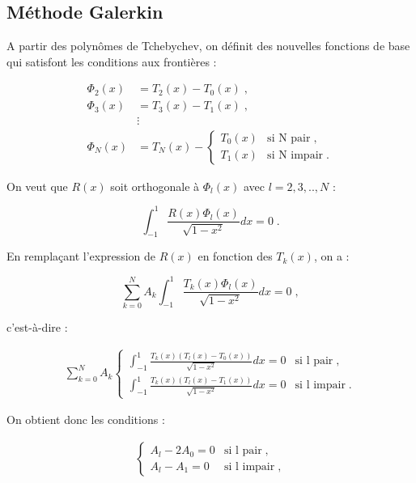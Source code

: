 \documentclass{report}
\begin{document}
\subsection{Méthode Galerkin}

A partir des polynômes de Tchebychev, on définit des nouvelles fonctions de base qui satisfont les conditions aux frontières :

\begin{align}
\Phi_{2}(x) &= T_2(x)-T_0(x)\;,\\
\Phi_{3}(x) &= T_3(x)-T_1(x)\;,\\
 & \vdots\\
\Phi_{N}(x) &= T_N(x)- \begin{cases}
    T_0(x) & \text{si N pair}\;, \\
T_1(x) & \text{si N impair}\;.
  \end{cases}
\end{align}

On veut que $R(x)$ soit orthogonale à $\Phi_l(x)$ avec $l=2,3,..,N$ :

\begin{equation}
\int_{-1}^1 \frac{R(x) \Phi_l(x)}{\sqrt{1-x^2}} dx = 0\;.
\end{equation}

En remplaçant l'expression de $R(x)$ en fonction des $T_k(x)$, on a :

\begin{equation}
\sum_{k=0}^{N}A_{k} \int_{-1}^1 \frac{T_k(x) \Phi_l(x)}{\sqrt{1-x^2}} dx = 0\;,
\end{equation}

c'est-à-dire :

\begin{align}
\sum_{k=0}^{N}A_{k} \begin{cases}
    \int_{-1}^1 \frac{T_k(x) \left(T_l(x)-T_0(x)\right)}{\sqrt{1-x^2}} dx = 0 & \text{si l pair}\;, \\
\int_{-1}^1 \frac{T_k(x) \left(T_l(x)-T_1(x)\right)}{\sqrt{1-x^2}} dx = 0 & \text{si l impair}\;.
  \end{cases}
\end{align}

On obtient donc les conditions :

\begin{align}
\begin{cases}
A_{l} - 2A_{0} = 0 & \text{si l pair}\;, \\
A_{l} - A_{1} = 0 & \text{si l impair}\;,
  \end{cases}
\end{align}
\end{document}
